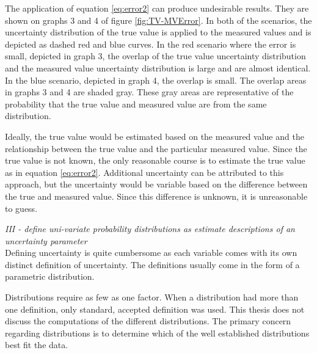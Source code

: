 \begin{linenumbers}
The application of equation \ref{eq:error2} can produce undesirable results.  They are shown on graphs 3 and 4 of figure \ref{fig:TV-MVError}.  In both of the scenarios, the uncertainty distribution of the true value is applied to the measured values and is depicted as dashed red and blue curves.  In the red scenario where the error is small, depicted in graph 3, the overlap of the true value uncertainty distribution and the measured value uncertainty distribution is large and are almost identical.  In the blue scenario, depicted in graph 4, the overlap is small.  The overlap areas in graphs 3 and 4 are shaded gray.  These gray areas are representative of the probability that the true value and measured value are from the same distribution.

Ideally, the true value would be estimated based on the measured value and the relationship between the true value and the particular measured value.  Since the true value is not known, the only reasonable course is to estimate the true value as in equation \ref{eq:error2}.  Additional uncertainty can be attributed to this approach, but the uncertainty would be variable based on the difference between the true and measured value.  Since this difference is unknown, it is unreasonable to guess.

\emph{III - define uni-variate probability distributions as estimate descriptions of an uncertainty parameter}\\

Defining uncertainty is quite cumbersome as each variable comes with its own distinct definition of uncertainty.  The definitions usually come in the form of a parametric distribution.

Distributions require as few as one factor.  When a distribution had more than one definition, only standard, accepted definition was used.  This thesis does not discuss the computations of the different distributions.  The primary concern regarding distributions is to determine which of the well established distributions best fit the data.





\end{linenumbers}
